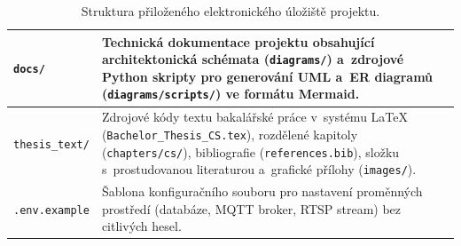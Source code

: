 \begin{table}[H]
\begin{tabular}{|l|p{12.6cm}|}
        \texttt{docs/} & Technická dokumentace projektu obsahující architektonická schémata (\texttt{diagrams/}) a~zdrojové Python skripty pro generování \acs{UML} a~\acs{ER} diagramů (\texttt{diagrams/scripts/}) ve formátu Mermaid. \\ \hline
        \texttt{thesis\_text/} & Zdrojové kódy textu bakalářské práce v~systému \LaTeX{} (\texttt{Bachelor\_Thesis\_CS.tex}), rozdělené kapitoly (\texttt{chapters/cs/}), bibliografie (\texttt{references.bib}), složku s~prostudovanou literaturou a~grafické přílohy (\texttt{images/}). \\ \hline
        \texttt{.env.example} & Šablona konfiguračního souboru pro nastavení proměnných prostředí (databáze, MQTT broker, \acs{RTSP} stream) bez citlivých hesel. \\ \hline
    \end{tabular}
    \caption{Struktura přiloženého elektronického úložiště projektu.}
    \label{tab:repo_structure}
\end{table}